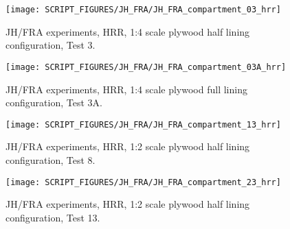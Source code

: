 \begin{figure}[h!]
\texttt{[image: SCRIPT\_FIGURES/JH\_FRA/JH\_FRA\_compartment\_03\_hrr]}
\caption[JH/FRA experiments, HRR, 1:4 scale plywood half lining configuration, Test 3]{JH/FRA experiments, HRR, 1:4 scale plywood half lining configuration, Test 3.}
\label{JH_FRA_plywood_01}
\end{figure}

\begin{figure}[h!]
\texttt{[image: SCRIPT\_FIGURES/JH\_FRA/JH\_FRA\_compartment\_03A\_hrr]}
\caption[JH/FRA experiments, HRR, 1:4 scale plywood full lining configuration, Test 3A]{JH/FRA experiments, HRR, 1:4 scale plywood full lining configuration, Test 3A.}
\label{JH_FRA_plywood_01A}
\end{figure}


\begin{figure}[h!]
\texttt{[image: SCRIPT\_FIGURES/JH\_FRA/JH\_FRA\_compartment\_13\_hrr]}
\caption[JH/FRA experiments, HRR, 1:2 scale plywood half lining configuration, Test 8]{JH/FRA experiments, HRR, 1:2 scale plywood half lining configuration, Test 8.}
\label{JH_FRA_plywood_02}
\end{figure}


\begin{figure}[h!]
\texttt{[image: SCRIPT\_FIGURES/JH\_FRA/JH\_FRA\_compartment\_23\_hrr]}
\caption[JH/FRA experiments, HRR, 1:1 scale plywood half lining configuration, Test 13]{JH/FRA experiments, HRR, 1:2 scale plywood half lining configuration, Test 13.}
\label{JH_FRA_plywood_03}
\end{figure}


